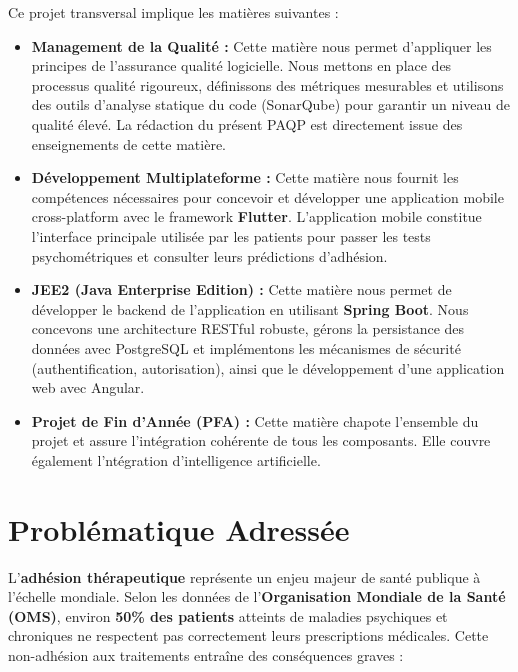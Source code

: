 \documentclass[12pt,a4paper]{report}
\begin{document}
Ce projet transversal implique les matières suivantes :

\begin{itemize}
    \item \textbf{Management de la Qualité :} Cette matière nous permet d'appliquer les principes de l'assurance qualité logicielle. Nous mettons en place des processus qualité rigoureux, définissons des métriques mesurables et utilisons des outils d'analyse statique du code (SonarQube) pour garantir un niveau de qualité élevé. La rédaction du présent PAQP est directement issue des enseignements de cette matière.
    
    \item \textbf{Développement Multiplateforme :} Cette matière nous fournit les compétences nécessaires pour concevoir et développer une application mobile cross-platform avec le framework \textbf{Flutter}. L'application mobile constitue l'interface principale utilisée par les patients pour passer les tests psychométriques et consulter leurs prédictions d'adhésion.
    
    \item \textbf{JEE2 (Java Enterprise Edition) :} Cette matière nous permet de développer le backend de l'application en utilisant \textbf{Spring Boot}. Nous concevons une architecture RESTful robuste, gérons la persistance des données avec PostgreSQL et implémentons les mécanismes de sécurité (authentification, autorisation), ainsi que le développement d'une application web avec Angular.
    
    \item \textbf{Projet de Fin d'Année (PFA) :} Cette matière chapote l'ensemble du projet et assure l'intégration cohérente de tous les composants. Elle couvre également l'ntégration d’intelligence artificielle.
\end{itemize}

\section{Problématique Adressée}

L'\textbf{adhésion thérapeutique} représente un enjeu majeur de santé publique à l'échelle mondiale. Selon les données de l'\textbf{Organisation Mondiale de la Santé (OMS)}, environ \textbf{50\% des patients} atteints de maladies psychiques et chroniques ne respectent pas correctement leurs prescriptions médicales. Cette non-adhésion aux traitements entraîne des conséquences graves :
\end{document}
